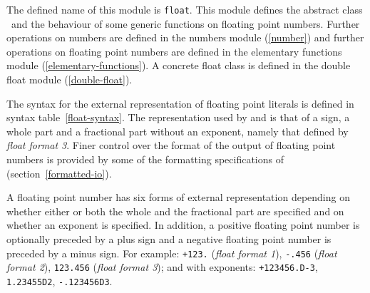 %
\begin{optDefinition}
\noindent
The defined name of this module is {\tt float}.  This module defines the
abstract class \ and the behaviour of some generic functions on
floating point numbers.  Further operations on numbers are defined in the
numbers module (\ref{number}) and further operations on floating point numbers
are defined in the elementary functions module (\ref{elementary-functions}).  A
concrete float class is defined in the double float module (\ref{double-float}).

%
The syntax for the external representation of floating point literals is defined
in syntax table~\ref{float-syntax}.  The representation used by
 and  is that of a sign, a whole part and a
fractional part without an exponent, namely that defined by {\em float format
    3}.  Finer control over the format of the output of floating point numbers
is provided by some of the formatting specifications of 
(section~\ref{formatted-io}).
%
\Syntax
\label{float-syntax}
%

A floating point number
has six forms of external representation depending on whether either or both the
whole and the fractional part are specified and on whether an exponent is
specified.  In addition, a positive floating point number is optionally preceded
by a plus sign and a negative floating point number is preceded by a minus sign.
For example:
%
\verb|+123.| ({\em float format 1\/}),
\verb|-.456| ({\em float format 2\/}),
\verb|123.456| ({\em float format 3\/}); and with exponents:
\verb|+123456.D-3|,
\verb|1.23455D2|,
\verb|-.123456D3|.


\end{optDefinition}
